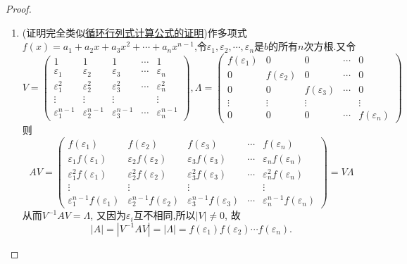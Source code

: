 \documentclass[../../main.tex]{subfiles}
\begin{document}
\begin{proof}
\begin{enumerate}[(1)]
\item (证明完全类似\hyperref[proposition:循环行列式计算公式]{循环行列式计算公式的证明})作多项式\(f(x)=a_1 + a_2x + a_3x^2+\cdots + a_nx^{n - 1}\),令\(\varepsilon_1,\varepsilon_2,\cdots,\varepsilon_n\)是\(b\)的所有\(n\)次方根.又令
\[
V = 
\begin{pmatrix}
1 & 1 & 1 & \cdots & 1\\
\varepsilon_1 & \varepsilon_2 & \varepsilon_3 & \cdots & \varepsilon_n\\
\varepsilon_1^2 & \varepsilon_2^2 & \varepsilon_3^2 & \cdots & \varepsilon_n^2\\
\vdots & \vdots & \vdots & & \vdots\\
\varepsilon_1^{n - 1} & \varepsilon_2^{n - 1} & \varepsilon_3^{n - 1} & \cdots & \varepsilon_n^{n - 1}
\end{pmatrix},
\Lambda = 
\begin{pmatrix}
f(\varepsilon_1) & 0 & 0 & \cdots & 0\\
0 & f(\varepsilon_2) & 0 & \cdots & 0\\
0 & 0 & f(\varepsilon_3) & \cdots & 0\\
\vdots & \vdots & \vdots & & \vdots\\
0 & 0 & 0 & \cdots & f(\varepsilon_n)
\end{pmatrix}
\]
则
\[
AV = 
\begin{pmatrix}
f(\varepsilon_1) & f(\varepsilon_2) & f(\varepsilon_3) & \cdots & f(\varepsilon_n)\\
\varepsilon_1f(\varepsilon_1) & \varepsilon_2f(\varepsilon_2) & \varepsilon_3f(\varepsilon_3) & \cdots & \varepsilon_nf(\varepsilon_n)\\
\varepsilon_1^2f(\varepsilon_1) & \varepsilon_2^2f(\varepsilon_2) & \varepsilon_3^2f(\varepsilon_3) & \cdots & \varepsilon_n^2f(\varepsilon_n)\\
\vdots & \vdots & \vdots & & \vdots\\
\varepsilon_1^{n - 1}f(\varepsilon_1) & \varepsilon_2^{n - 1}f(\varepsilon_2) & \varepsilon_3^{n - 1}f(\varepsilon_3) & \cdots & \varepsilon_n^{n - 1}f(\varepsilon_n)
\end{pmatrix}
= V\Lambda
\]
从而$V^{-1}AV=\Lambda$,
又因为\(\varepsilon_i\)互不相同,所以\(|V|\neq0\),
故
\[
|A|=|V^{-1}AV| = |\Lambda| = f(\varepsilon_1)f(\varepsilon_2)\cdots f(\varepsilon_n).
\]
\end{enumerate}
\end{proof}
\end{document}
